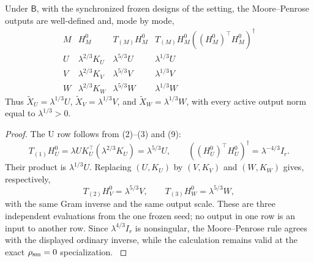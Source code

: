 \begin{proposition}\label{prop:step-013-frozen-landing}
Under \(\mathsf B\), with
the synchronized frozen designs of the setting, the Moore--Penrose outputs
are well-defined and, mode by mode,
\[
\begin{array}{c|c|c|c}
M & H_M^0 & T_{(M)}H_M^0 &
T_{(M)}H_M^0((H_M^0)^\top H_M^0)^\dagger\\ \hline
U & \lambda^{2/3}K_U & \lambda^{5/3}U & \lambda^{1/3}U\\
V & \lambda^{2/3}K_V & \lambda^{5/3}V & \lambda^{1/3}V\\
W & \lambda^{2/3}K_W & \lambda^{5/3}W & \lambda^{1/3}W
\end{array}
\tag{10}
\]
Thus \(\widetilde X_U=\lambda^{1/3}U\),
\(\widetilde X_V=\lambda^{1/3}V\), and
\(\widetilde X_W=\lambda^{1/3}W\), with every active output norm equal to
\(\lambda^{1/3}>0\).

\begin{proof}
The U row follows from (2)--(3) and (9):
\[
T_{(1)}H_U^0
=\lambda U K_U^\top(\lambda^{2/3}K_U)
=\lambda^{5/3}U,\qquad
((H_U^0)^\top H_U^0)^\dagger=\lambda^{-4/3}I_r.
\tag{11}
\]
Their product is \(\lambda^{1/3}U\). Replacing \((U,K_U)\) by
\((V,K_V)\) and \((W,K_W)\) gives, respectively,
\[
T_{(2)}H_V^0=\lambda^{5/3}V,\qquad
T_{(3)}H_W^0=\lambda^{5/3}W,
\tag{12}
\]
with the same Gram inverse and the same output scale. These are three
independent evaluations from the one frozen seed; no output in one row is an
input to another row. Since \(\lambda^{4/3}I_r\) is nonsingular, the
Moore--Penrose rule agrees with the displayed ordinary inverse, while the
calculation remains valid at the exact \(\rho_{\rm sm}=0\) specialization.
\(\)


\end{proof}
\end{proposition}
